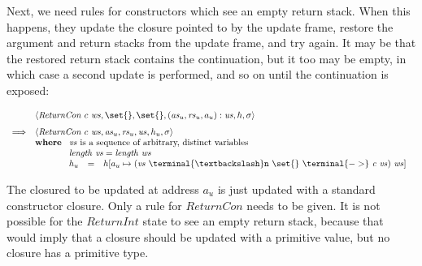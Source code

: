 \documentclass[10pt,a4paper]{exam} %
\begin{document}
Next, we need rules for constructors which see an empty return stack. When this happens, they update the closure pointed to by the update frame, restore the argument and return stacks from the update frame, and try again. It may be that the restored return stack contains the continuation, but it too may be empty, in which case a second update is performed, and so on until the continuation is exposed:
\begin{mdframed}
\begin{equation}
\begin{array}{cl}
 & \langle \mathit{ReturnCon}~c~\mathit{ws}, \set{}, \set{}, (\mathit{as}_u, \mathit{rs}_u, a_u) : \mathit{us}, h, \sigma \rangle \\[0.25cm]
\Longrightarrow & \langle \mathit{ReturnCon}~c~\mathit{ws}, \mathit{as}_u, \mathit{rs}_u, \mathit{us}, h_u, \sigma \rangle \\
 & \mathbf{where}~\begin{array}[t]{lcl}
 \multicolumn{3}{l}{\mathit{vs}~\text{is a sequence of arbitrary, distinct variables}} \\
 \multicolumn{3}{l}{\mathit{length}~\mathit{vs} = \mathit{length}~\mathit{ws}} \\
 h_u & = & h[a_u \mapsto (\mathit{vs}~\terminal{\textbackslash}\texttt{n}~\set{}~\terminal{->}~\mathit{c}~\mathit{vs})~\mathit{ws}]
 \end{array}
\end{array}
\end{equation}
\end{mdframed}
The closured to be updated at address $a_u$ is just updated with a standard constructor closure. Only a rule for $\mathit{ReturnCon}$ needs to be given. It is not possible for the $\mathit{ReturnInt}$ state to see an empty return stack, because that would imply that a closure should be updated with a primitive value, but no closure has a primitive type.
\end{document}
